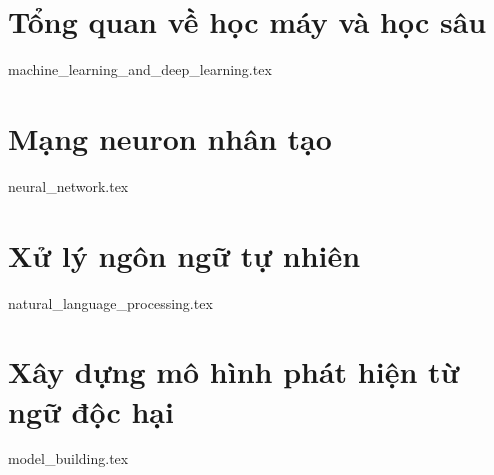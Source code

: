 \section{Tổng quan về học máy và học sâu}
{machine_learning_and_deep_learning.tex}

\section{Mạng neuron nhân tạo}
{neural_network.tex}

\section{Xử lý ngôn ngữ tự nhiên}
{natural_language_processing.tex}

\section{Xây dựng mô hình phát hiện từ ngữ độc hại}
{model_building.tex}
